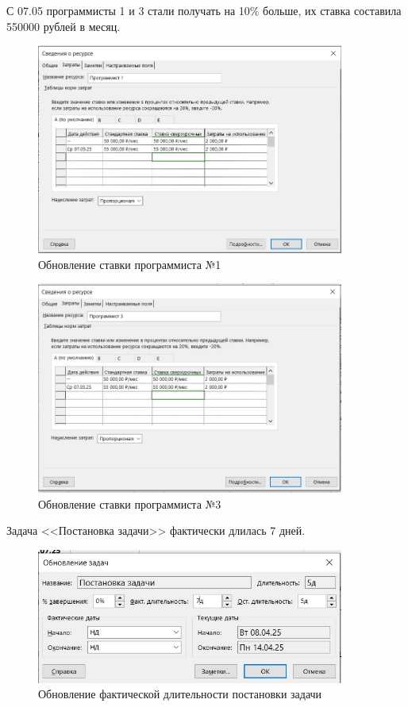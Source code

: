 С 07.05 программисты 1 и 3 стали получать на 10\% больше, их ставка составила 550000 рублей в месяц.

\begin{figure}[H]
	\centering
	\includegraphics[width=0.9\textwidth]{img/task10/screen10_3.jpg}
	\caption{Обновление ставки программиста №1}
	\label{fig:screen10_3}
\end{figure}

\begin{figure}[H]
	\centering
	\includegraphics[width=0.9\textwidth]{img/task10/screen10_4.jpg}
	\caption{Обновление ставки программиста №3}
	\label{fig:screen10_4}
\end{figure}

Задача <<Постановка задачи>> фактически длилась 7 дней.

\begin{figure}[H]
	\centering
	\includegraphics[width=0.9\textwidth]{img/task10/screen10_5.jpg}
	\caption{Обновление фактической длительности постановки задачи}
	\label{fig:screen10_5}
\end{figure}

